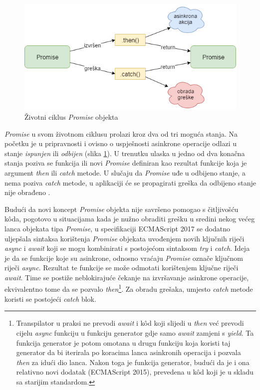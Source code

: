 \documentclass[times, utf8, diplomski, numeric]{fer}
\newcommand{\razmakp}{\vspace{18pt}}
\begin{document}
\begin{figure}[!htb] %
    \centering
    \includegraphics[width=14cm]{images/promise.png}
    \caption{Životni ciklus \emph{Promise} objekta}
    \label{fig:promise_lifecycle}
\end{figure}

\newpage
\emph{Promise} u svom životnom ciklusu prolazi kroz dva od tri moguća stanja.
Na početku je u pripravnosti  i ovisno o uspješnosti asinkrone operacije odlazi u stanje \emph{ispunjen}  ili \emph{odbijen}  (slika \ref{fig:promise_lifecycle}).
U trenutku ulaska u jedno od dva konačna stanja poziva se funkcija ili novi \emph{Promise} definiran kao rezultat funkcije koja je argument \emph{then} ili \emph{catch} metode.
U slučaju da \emph{Promise} uđe u odbijeno stanje, a nema poziva \emph{catch} metode, u aplikaciji će se propagirati greška da odbijeno stanje nije obrađeno  \citep{mdn_promise}.

\razmakp

Budući da novi koncept \emph{Promise} objekta nije savršeno pomogao s čitljivošću kôda, pogotovo u situacijama kada je nužno obraditi grešku u sredini nekog većeg lanca objekata tipa \emph{Promise}, u specifikaciji ECMAScript 2017 se dodatno uljepšala sintaksa korištenja \emph{Promise} objekata uvođenjem novih ključnih riječi \emph{async} i \emph{await} koji se mogu kombinirati s postojećom sintaksom \emph{try} i \emph{catch}.
Ideja je da se funkcije koje su asinkrone, odnosno vraćaju \emph{Promise} označe ključnom riječi \emph{async}.
Rezultat te funkcije se može odmotati korištenjem ključne riječi \emph{await}.
Time se postiže neblokirajuće čekanje na izvršavanje asinkrone operacije, ekvivalentno tome da se pozvalo \emph{then}\footnote{
    Transpilator u praksi ne prevodi \emph{await} i kôd koji slijedi u \emph{then} već prevodi cijelu \emph{async} funkciju u funkciju generator  gdje samo \emph{await} zamjeni s \emph{yield}.
    Ta funkcija generator je potom omotana u drugu funkciju koja koristi taj generator da bi iterirala po koracima lanca asinkronih operacija i pozvala \emph{then} za idući dio lanca. Nakon toga je funkcija generator, budući da je i ona relativno novi dodatak (ECMAScript 2015), prevedena u kôd koji je u skladu sa starijim standardom.
}.
Za obradu grešaka, umjesto \emph{catch} metode koristi se postojeći \emph{catch} blok.
\end{document}
